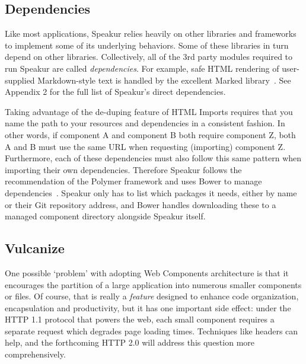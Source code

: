\subsection{Dependencies}
Like most applications, Speakur relies heavily on other libraries and frameworks to implement some of its underlying behaviors. 
Some of these libraries in turn depend on other libraries.
Collectively, all of the 3rd party modules required to run Speakur are called \textit{dependencies}.
For example, safe HTML rendering of user-supplied Markdown-style text is handled by the excellent Marked library~\cite{christopherjeffrey2014}.
See Appendix 2 for the full list of Speakur's direct dependencies.

Taking advantage of the de-duping feature of HTML Imports
requires that you name the path to your resources and dependencies in a consistent fashion.
In other words, if component A and component B both require component Z, both A and B must use the same URL when requesting (importing) component Z.
Furthermore, each of these dependencies must also follow this same pattern when importing their own dependencies.
Therefore Speakur follows the recommendation of the Polymer framework and uses Bower to manage dependencies~\cite{bowercontributors2015}. 
Speakur only has to list which packages it needs, either by name or their Git repository address, 
and Bower handles downloading these to a managed component directory alongside Speakur itself.

\subsection{Vulcanize}
One possible `problem' with adopting Web Components architecture is that it encourages the partition of a large application into numerous smaller components or files.
Of course, that is really a \textit{feature} designed to enhance code organization, encapsulation and productivity, 
but it has one important side effect: 
under the HTTP 1.1 protocol that powers the web, each small component requires a separate request which degrades page loading times.
Techniques like  headers can help, and the forthcoming HTTP 2.0 will address this question more comprehensively.

